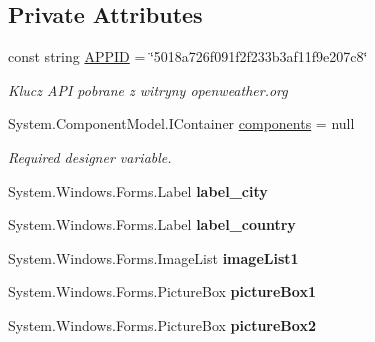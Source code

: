 \subsection*{Private Attributes}
\begin{DoxyCompactItemize}
\item 
const string \mbox{\hyperlink{class_pogodynka__w57003_1_1panel__glony_a66dfd1c1fa2fc6daa20d17f8bf64c7a4}{A\+P\+P\+ID}} = \char`\"{}5018a726f091f2f233b3af11f9e207c8\char`\"{}
\begin{DoxyCompactList}\small\item\em Klucz A\+PI pobrane z witryny openweather.\+org \end{DoxyCompactList}\item 
System.\+Component\+Model.\+I\+Container \mbox{\hyperlink{class_pogodynka__w57003_1_1panel__glony_aa887be71e8f5b4267c82225f05b88ae2}{components}} = null
\begin{DoxyCompactList}\small\item\em Required designer variable. \end{DoxyCompactList}\item 
\mbox{\label{class_pogodynka__w57003_1_1panel__glony_a8e714ed561f0833133090c8e94e8d2c0}} 
System.\+Windows.\+Forms.\+Label {\bfseries label\+\_\+city}
\item 
\mbox{\label{class_pogodynka__w57003_1_1panel__glony_a4e6b70274b747f25558c77c9f3773ec0}} 
System.\+Windows.\+Forms.\+Label {\bfseries label\+\_\+country}
\item 
\mbox{\label{class_pogodynka__w57003_1_1panel__glony_abacfb365dfa726f0c10afbbf70ac434d}} 
System.\+Windows.\+Forms.\+Image\+List {\bfseries image\+List1}
\item 
\mbox{\label{class_pogodynka__w57003_1_1panel__glony_a16f73538b1eac666c53797dcb4e5c9c5}} 
System.\+Windows.\+Forms.\+Picture\+Box {\bfseries picture\+Box1}
\item 
\mbox{\label{class_pogodynka__w57003_1_1panel__glony_a3b75d6990cdb369eee1e8b58b0f6c3d6}} 
System.\+Windows.\+Forms.\+Picture\+Box {\bfseries picture\+Box2}
\item 

\end{DoxyCompactItemize}

